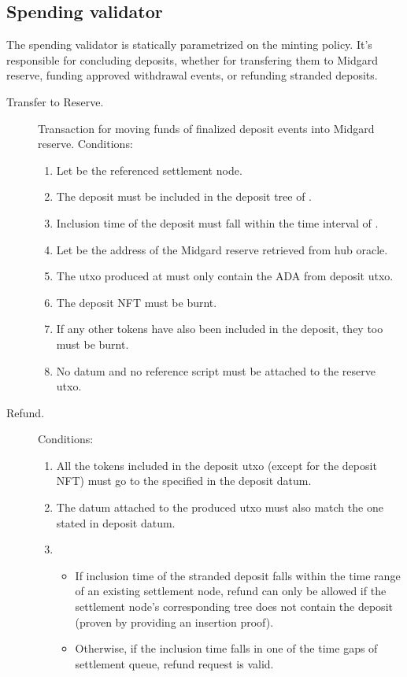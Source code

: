 \documentclass[../midgard.tex]{subfiles}
\begin{document}
\subsection{Spending validator}
\label{h:deposit-spending-validator}

The  spending validator is statically parametrized on the  minting policy.
It's responsible for concluding deposits, whether for transfering them to Midgard reserve, funding approved withdrawal events, or refunding stranded deposits.

\begin{description}
  \item[Transfer to Reserve.] Transaction for moving funds of finalized deposit events into Midgard reserve.
    Conditions:
    \begin{enumerate}
      \item Let  be the referenced settlement node.
      \item The deposit must be included in the deposit tree of .
      \item Inclusion time of the deposit must fall within the time interval of .
      \item Let  be the address of the Midgard reserve retrieved from hub oracle.
      \item The utxo produced at  must only contain the ADA from deposit utxo.
      \item The deposit NFT must be burnt.
      \item If any other tokens have also been included in the deposit, they too must be burnt.
      \item No datum and no reference script must be attached to the reserve utxo.
    \end{enumerate}
  \item[Refund.] 
    Conditions:
    \begin{enumerate}
      \item All the tokens included in the deposit utxo (except for the deposit NFT) must go to the  specified in the deposit datum.
      \item The datum attached to the produced utxo must also match the one stated in deposit datum.
      \item 
        \begin{itemize}
          \item If inclusion time of the stranded deposit falls within the time range of an existing settlement node, refund can only be allowed if the settlement node's corresponding tree does not contain the deposit (proven by providing an insertion proof).
          \item Otherwise, if the inclusion time falls in one of the time gaps of settlement queue, refund request is valid.
        \end{itemize}
    \end{enumerate}
\end{description}
\end{document}
